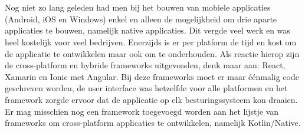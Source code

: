 %
%

%



\chapter*{}

Nog niet zo lang geleden had men bij het bouwen van mobiele applicaties (Android, iOS en Windows) enkel en alleen de mogelijkheid om drie aparte applicaties te bouwen, namelijk native applicaties. Dit vergde veel werk en was heel kostelijk voor veel bedrijven. Enerzijds is er per platform de tijd en kost om de applicatie te ontwikkelen maar ook om te onderhouden. Als reactie hierop zijn de cross-platform en hybride frameworks uitgevonden, denk maar aan: React, Xamarin en Ionic met Angular. Bij deze frameworks moet er maar éénmalig code geschreven worden, de user interface was hetzelfde voor alle platformen en het framework zorgde ervoor dat de applicatie op elk besturingssysteem kon draaien. Er mag misschien nog een framework toegevoegd worden aan het lijstje van frameworks om cross-platform applicaties te ontwikkelen, namelijk Kotlin/Native.


